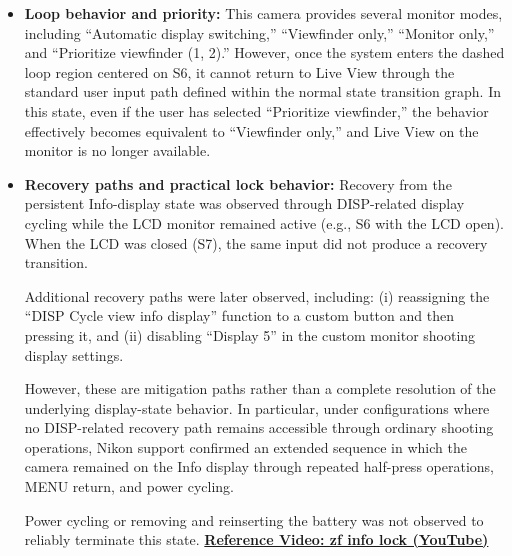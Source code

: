 \documentclass[a4paper,10pt]{article}
\begin{document}
\begin{itemize}
For example, in Step 5 the system transitions to S1 (Live View), whereas
in Step 28 it transitions into the S6 (Info display) loop. Thus, the
outcome is not uniquely determined for the same input, meaning that whether
shooting is possible cannot be known prior to operation.

\item \textbf{Loop behavior and priority:}
This camera provides several monitor modes, including ``Automatic display
switching,'' ``Viewfinder only,'' ``Monitor only,'' and ``Prioritize
viewfinder (1, 2).'' However, once the system enters the dashed loop region
centered on S6, it cannot return to Live View through the standard user
input path defined within the normal state transition graph. In this state,
even if the user has selected ``Prioritize viewfinder,'' the behavior
effectively becomes equivalent to ``Viewfinder only,'' and Live View on the
monitor is no longer available.

\item \textbf{Recovery paths and practical lock behavior:}
Recovery from the persistent Info-display state was observed through
DISP-related display cycling while the LCD monitor remained active
(e.g., S6 with the LCD open). When the LCD was closed (S7), the same input
did not produce a recovery transition.

Additional recovery paths were later observed, including:
(i) reassigning the ``DISP Cycle view info display'' function to a custom
button and then pressing it, and
(ii) disabling ``Display 5'' in the custom monitor shooting display
settings.

However, these are mitigation paths rather than a complete resolution of
the underlying display-state behavior. In particular, under configurations
where no DISP-related recovery path remains accessible through ordinary
shooting operations, Nikon support confirmed an extended sequence in which
the camera remained on the Info display through repeated half-press
operations, MENU return, and power cycling.

Power cycling or removing and reinserting the battery was not observed to
reliably terminate this state.
\href{https://youtu.be/CgRiFayc5yQ}{\textbf{Reference Video: zf info lock (YouTube)}}


\end{itemize}
\end{document}
